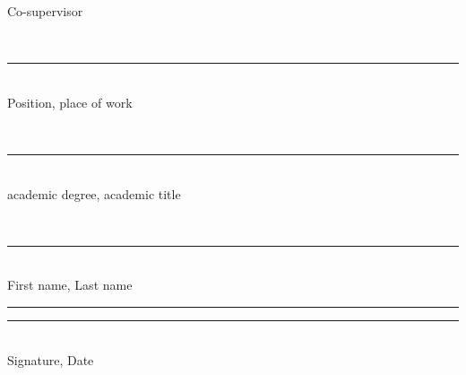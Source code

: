 \begin{titlepage}
\noindent
\begin{minipage}[t]{0.42\textwidth}
\raggedright
Co-supervisor

\vspace{0.18cm}
\strut\hseCoSupervisorTitle\\[-0.05cm]
\rule{6.1cm}{0.4pt}\\[-0.05cm]
{\scriptsize Position, place of work}

\vspace{0.08cm}
\strut\hseCoSupervisorDegree\\[-0.05cm]
\rule{6.1cm}{0.4pt}\\[-0.05cm]
{\scriptsize academic degree, academic title}

\vspace{0.08cm}
\strut\hseCoSupervisorName\\[-0.05cm]
\rule{6.1cm}{0.4pt}\\[-0.05cm]
{\scriptsize First name, Last name}

\vspace{0.08cm}
\rule{3.6cm}{0.4pt}\quad\rule{2.2cm}{0.4pt}\\[-0.05cm]
{\scriptsize Signature, Date}
\end{minipage}
\hfill
\begin{minipage}[t]{0.42\textwidth}
\strut
\end{minipage}
\fi

\vfill

\begin{center}
\textbf{\hseCityEn{} \hseYear}
\end{center}
\end{titlepage}


\setcounter{page}{2}
\clearpage
